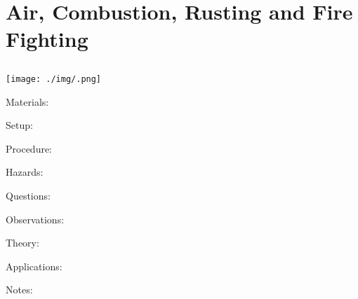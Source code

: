 \section{Air, Combustion, Rusting and Fire Fighting}

\begin{multicols}{2}


\section*{}


\subsection{}

\begin{center}
\texttt{[image: ./img/.png]}
\end{center}

\begin{description*}
\item[Materials:]{}
\item[Setup:]{}
\item[Procedure:]{}
\item[Hazards:]{}
\item[Questions:]{}
\item[Observations:]{}
\item[Theory:]{}
\item[Applications:]{}
\item[Notes:]{}
\end{description*}



\end{multicols}

\pagebreak